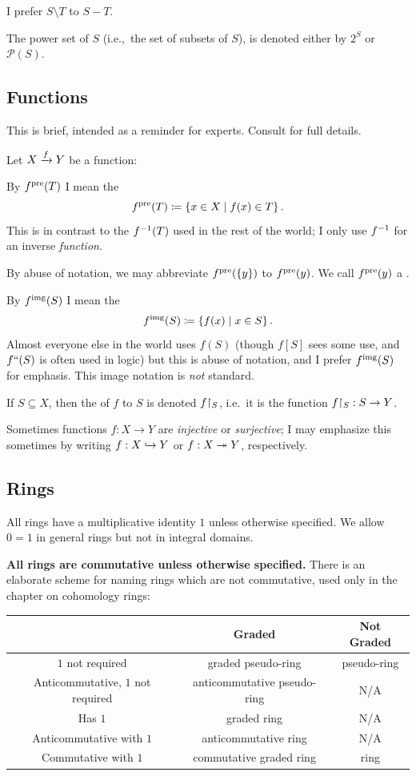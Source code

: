 I prefer $S \setminus T$ to $S - T$.

The power set of $S$ (i.e.,\ the set of subsets of $S$),
is denoted either by $2^S$ or $\mathcal P(S)$.

\subsection{Functions}
This is brief, intended as a reminder for experts.
Consult  for full details.

Let $X \xrightarrow{f} Y$ be a function:
\begin{itemize}
\ii By $f^{\text{pre}}(T)$ I mean the 
\[ f^{\text{pre}}(T) \coloneqq \left\{ x \in X \mid f(x) \in T \right\}.  \]
This is in contrast to the $f^{-1}(T)$ used in the rest of the world;
I only use $f^{-1}$ for an inverse \emph{function}.

By abuse of notation, we may abbreviate $f^{\text{pre}}(\{y\})$ to $f^{\text{pre}}(y)$.
We call $f^{\text{pre}}(y)$ a .

\ii By $f^{\text{img}}(S)$ I mean the 
\[ f^{\text{img}}(S) \coloneqq \left\{ f(x) \mid x \in S \right\}. \]
Almost everyone else in the world uses $f(S)$
(though $f[S]$ sees some use, and $f``(S)$ is often used in logic)
but this is abuse of notation,
and I prefer $f^{\text{img}}(S)$ for emphasis.
This image notation is \emph{not} standard.

\ii If $S \subseteq X$, then the  of $f$ to $S$
is denoted $f \restrict{S}$,
i.e.\ it is the function $f \restrict{S} : S \to Y$.

\ii Sometimes functions $f : X \to Y$ are \emph{injective} or \emph{surjective};
I may emphasize this sometimes by writing $f : X \hookrightarrow Y$ or $f : X \twoheadrightarrow Y$, respectively.
\end{itemize}

\subsection{Rings}
All rings have a multiplicative identity $1$ unless otherwise specified.
We allow $0=1$ in general rings but not in integral domains.

\textbf{All rings are commutative unless otherwise specified.}
There is an elaborate scheme for naming rings which are not commutative,
used only in the chapter on cohomology rings:

\begin{center}
	\small
	\begin{tabular}[h]{|c|cc|}
		\hline
		& Graded & Not Graded \\ \hline
		$1$ not required & graded pseudo-ring & pseudo-ring \\
		Anticommutative, $1$ not required & anticommutative pseudo-ring & N/A \\
		Has $1$ & graded ring & N/A \\
		Anticommutative with $1$ & anticommutative ring & N/A \\ 
		Commutative with $1$ & commutative graded ring & ring \\ \hline
	\end{tabular}
\end{center}


